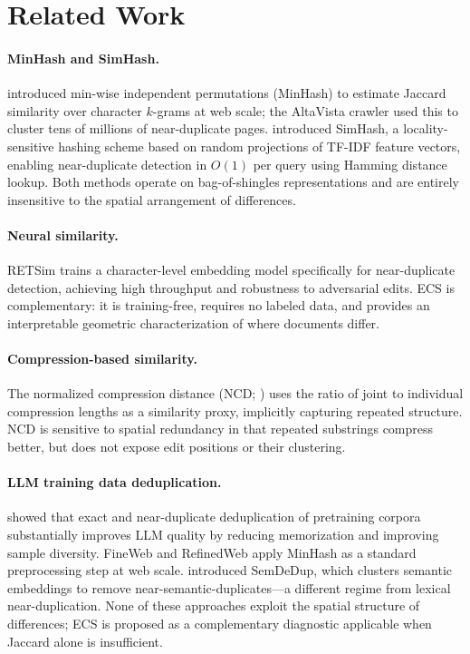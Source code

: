 \documentclass[11pt,letterpaper]{article}
\begin{document}
\section{Related Work}
\label{sec:related}

\paragraph{MinHash and SimHash.}
\citet{Broder1997} introduced min-wise independent permutations (MinHash) to estimate Jaccard similarity over character $k$-grams at web scale; the AltaVista crawler used this to cluster tens of millions of near-duplicate pages. \citet{Manku2007} introduced SimHash, a locality-sensitive hashing scheme based on random projections of TF-IDF feature vectors, enabling near-duplicate detection in $O(1)$ per query using Hamming distance lookup. Both methods operate on bag-of-shingles representations and are entirely insensitive to the spatial arrangement of differences.

\paragraph{Neural similarity.}
RETSim \citep{Zhang2023} trains a character-level embedding model specifically for near-duplicate detection, achieving high throughput and robustness to adversarial edits. ECS is complementary: it is training-free, requires no labeled data, and provides an interpretable geometric characterization of where documents differ.

\paragraph{Compression-based similarity.}
The normalized compression distance (NCD; \citealt{Li2004}) uses the ratio of joint to individual compression lengths as a similarity proxy, implicitly capturing repeated structure. NCD is sensitive to spatial redundancy in that repeated substrings compress better, but does not expose edit positions or their clustering.

\paragraph{LLM training data deduplication.}
\citet{Lee2022} showed that exact and near-duplicate deduplication of pretraining corpora substantially improves LLM quality by reducing memorization and improving sample diversity. FineWeb \citep{Penedo2024} and RefinedWeb \citep{Penedo2023} apply MinHash as a standard preprocessing step at web scale. \citet{Abbas2023} introduced SemDeDup, which clusters semantic embeddings to remove near-semantic-duplicates---a different regime from lexical near-duplication. None of these approaches exploit the spatial structure of differences; ECS is proposed as a complementary diagnostic applicable when Jaccard alone is insufficient.
\end{document}
